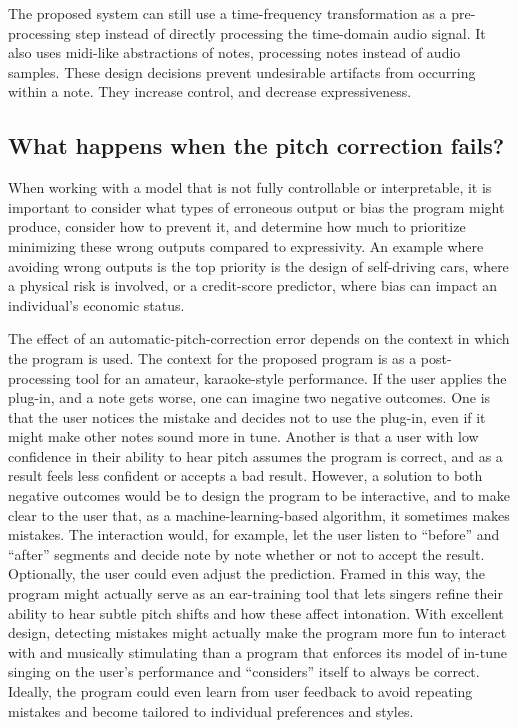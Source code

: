 The proposed system can still use a time-frequency transformation as a pre-processing step instead of directly processing the time-domain audio signal. It also uses \gls{midi}-like abstractions of notes, processing notes instead of audio samples. These design decisions prevent undesirable artifacts from occurring within a note. They increase control, and decrease expressiveness. 

\subsection{What happens when the pitch correction fails?}
When working with a model that is not fully controllable or interpretable, it is important to consider what types of erroneous output or bias the program might produce, consider how to prevent it, and determine how much to prioritize minimizing these wrong outputs compared to expressivity. An example where avoiding wrong outputs is the top priority is the design of self-driving cars, where a physical risk is involved, or a credit-score predictor, where bias can impact an individual's economic status. 

The effect of an automatic-pitch-correction error depends on the context in which the program is used. The context for the proposed program is as a post-processing tool for an amateur, karaoke-style performance. If the user applies the plug-in, and a note gets worse, one can imagine two negative outcomes. One is that the user notices the mistake and decides not to use the plug-in, even if it might make other notes sound more in tune. Another is that a user with low confidence in their ability to hear pitch assumes the program is correct, and as a result feels less confident or accepts a bad result. However, a solution to both negative outcomes would be to design the program to be interactive, and to make clear to the user that, as a machine-learning-based algorithm, it sometimes makes mistakes. The interaction would, for example, let the user listen to ``before'' and ``after'' segments and decide note by note whether or not to accept the result. Optionally, the user could even adjust the prediction. Framed in this way, the program might actually serve as an ear-training tool that lets singers refine their ability to hear subtle pitch shifts and how these affect intonation. With excellent design, detecting mistakes might actually make the program more fun to interact with and musically stimulating than a program that enforces its model of in-tune singing on the user's performance and ``considers'' itself to always be correct. Ideally, the program could even learn from user feedback to avoid repeating mistakes and become tailored to individual preferences and styles.

